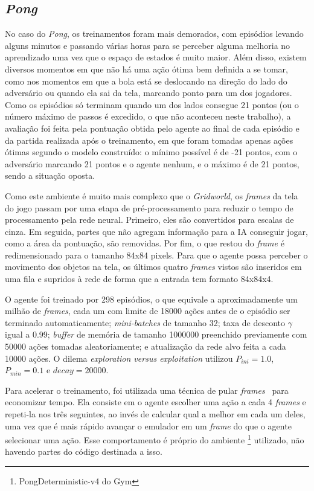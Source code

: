 \subsection{\textit{Pong}}
\label{sec:exp_pong}

No caso do \textit{Pong}, os treinamentos foram mais demorados, com episódios levando alguns minutos e passando várias horas para se perceber alguma melhoria no aprendizado uma vez que o espaço de estados é muito maior.
Além disso, existem diversos momentos em que não há uma ação ótima bem definida a se tomar, como nos momentos em que a bola está se deslocando na direção do lado do adversário ou quando ela sai da tela, marcando ponto para um dos jogadores.
Como os episódios só terminam quando um dos lados consegue 21 pontos (ou o número máximo de passos é excedido, o que não aconteceu neste trabalho), a avaliação foi feita pela pontuação obtida pelo agente ao final de cada episódio e da partida realizada após o treinamento, em que foram tomadas apenas ações ótimas segundo o modelo construído:
o mínimo possível é de -21 pontos, com o adversário marcando 21 pontos e o agente nenhum, e o máximo é de 21 pontos, sendo a situação oposta.

Como este ambiente é muito mais complexo que o \textit{Gridworld}, os \textit{frames} da tela do jogo passam por uma etapa de pré-processamento para reduzir o tempo de processamento pela rede neural.
Primeiro, eles são convertidos para escalas de cinza.
Em seguida, partes que não agregam informação para a IA conseguir jogar, como a área da pontuação, são removidas.
Por fim, o que restou do \textit{frame} é redimensionado para o tamanho 84x84 pixels.
Para que o agente possa perceber o movimento dos objetos na tela, os últimos quatro \textit{frames} vistos são inseridos em uma fila e supridos à rede de forma que a entrada tem formato 84x84x4.

O agente foi treinado por 298 episódios, o que equivale a aproximadamente um milhão de \textit{frames}, cada um com limite de 18000 ações antes de o episódio ser terminado automaticamente;
\textit{mini-batches} de tamanho 32; taxa de desconto $\gamma$ igual a 0.99;
\textit{buffer} de memória de tamanho 1000000 preenchido previamente com 50000 ações tomadas aleatoriamente;
e atualização da rede alvo feita a cada 10000 ações.
O dilema \textit{exploration versus exploitation} utilizou $P_{ini} = 1.0$, $P_{min} = 0.1$ e $decay = 20000$.

Para acelerar o treinamento, foi utilizada uma técnica de pular \textit{frames}~\cite{DBLP:journals/corr/abs-1207-4708} para economizar tempo.
Ela consiste em o agente escolher uma ação a cada 4 \textit{frames} e repeti-la nos três seguintes, ao invés de calcular qual a melhor em cada um deles, uma vez que é mais rápido avançar o emulador em um \textit{frame} do que o agente selecionar uma ação.
Esse comportamento é próprio do ambiente \footnote{PongDeterministic-v4 do Gym} utilizado, não havendo partes do código destinada a isso.

